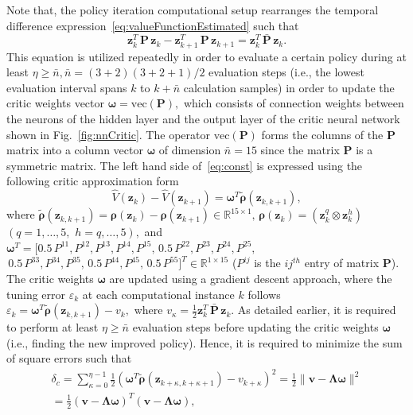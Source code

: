 \documentclass[conference]{IEEEtran}
\begin{document}
Note that, the policy iteration computational setup rearranges the temporal difference expression~\eqref{eq:valueFunctionEstimated} such that %
%
\begin{equation}
\label{eq:const}
\mathbf{z}_k^T\, \mathbf{P}\, \mathbf{z}_k - \mathbf{z}_{k+1}^T\, \mathbf{P}\, \mathbf{z}_{k+1} = \mathbf{z}_k^T\, \bar{\mathbf{P}}\, \mathbf{z}_k. 
\end{equation}
%
This equation is utilized repeatedly in order to evaluate a certain policy during at least $\eta\ge \bar n, \bar n= (3+2)(3+2+1)/2$ evaluation steps (i.e., the lowest evaluation interval spans $k$ to $k+\bar n$ calculation samples) in order to update the critic weights vector  $\boldsymbol{\omega}=\mathrm{vec}(\mathbf{P}),$ which consists of connection weights between the neurons of the hidden layer and the output layer of the critic neural network shown in Fig.~\eqref{fig:nnCritic}. The operator $\mathrm{vec}(\mathbf{P})$ forms the columns of the $\mathbf{P}$ matrix into a column vector $\mathbf{\omega}$ of dimension $\bar{n}=15$ since the matrix $\mathbf{P}$ is a symmetric matrix. The left hand side of~\eqref{eq:const} is expressed using the following critic approximation form %
%
$$\hat{V}(\mathbf{z}_k)-\hat{V}(\mathbf{z}_{k+1})=\boldsymbol{\omega}^T\tilde{\bm{\rho}}(\mathbf{z}_{k,k+1}),$$
%
where $\tilde{\bm{\rho}}(\mathbf{z}_{k,k+1})=\bm{\rho}(\mathbf{z}_k)-\bm{\rho}(\mathbf{z}_{k+1}) \in \mathbb{R}^{15 \times 1}, \, \bm{\rho}(\mathbf{z}_k)=\left(\mathbf{z}^q_k\otimes\mathbf{z}^h_k\right)$ $(q=1,\dots, 5, \,\, h=q,\dots,5),$ and $\boldsymbol{\omega}^T = [0.5 \, P^{11},P^{12},P^{13},P^{14}, P^{15}, \, 0.5 \, P^{22}, P^{23},P^{24},P^{25},$ $\,0.5 \, P^{33}, P^{34},P^{35},\,0.5 \, P^{44},P^{45}, \,0.5 \, P^{55}]^T \in \mathbb{R}^{1\times 15}$ ($P^{ij}$ is the $ij^{th}$ entry of matrix $\mathbf{P}$). %
%
The critic weights $\boldsymbol{\omega}$ are updated using a gradient descent approach, where the tuning error $\varepsilon_k$ at each computational instance $k$ follows $\varepsilon_k =\boldsymbol{\omega}^T\tilde{\bm{\rho}}(\mathbf{z}_{k,k+1})-{v}_k,$ where $v_\kappa = \frac{1}{2}\mathbf{z}_{k}^T \, \bar{\mathbf{P}} \, \mathbf{z}_{k}$. As detailed earlier, it is required to perform at least $\eta \ge \bar n$ evaluation steps before updating the critic weights $\boldsymbol{\omega}$ (i.e., finding the new improved policy). Hence, it is required to minimize the sum of square errors such that %
%
\begin{multline*}
  \delta_c =\sum_{\kappa=0}^{\eta-1}\frac{1}{2}(\boldsymbol{\omega}^T\tilde{\bm{\rho}}(\mathbf{z}_{k+\kappa,k+\kappa+1})-{v}_{k+\kappa})^2 = \frac{1}{2}\| \mathbf{v} - \bm{\Lambda}\bm{\omega}\|^2\\
  =\frac{1}{2}\left(\mathbf{v} - \bm{\Lambda}\bm{\omega}\right)^T \left(\mathbf{v} - \bm{\Lambda}\bm{\omega}\right), 
\end{multline*}
\end{document}
